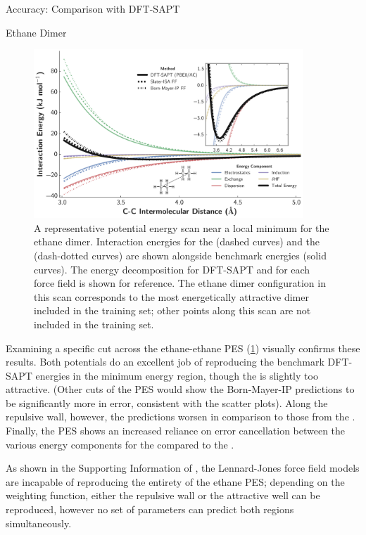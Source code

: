 \begin{subsection}{Accuracy: Comparison with DFT-SAPT}
\begin{subsubsection}{Ethane Dimer}
    \begin{figure}
    \includegraphics[width=0.9\textwidth]{isotropic/ethane_ethane_pes.pdf}
    \caption{
    A representative potential energy scan near a local minimum for the ethane dimer. 
    Interaction energies for the \isaffold (dashed curves) and the \saptff (dash-dotted
    curves) are shown alongside benchmark \saptpbeo energies (solid curves). The
    energy decomposition for DFT-SAPT and for each force field is shown for reference.
     The ethane dimer configuration in this scan corresponds to the most
    energetically attractive dimer included in the training set; other
    points along this scan are not included in the training set.
    }
    \label{fig:isotropic-ethane-pes}
    \end{figure}

Examining a specific cut across the ethane-ethane PES
(\cref{fig:isotropic-ethane-pes}) visually confirms these results.  Both potentials do
an excellent job of reproducing the benchmark DFT-SAPT energies in the minimum
energy region, though the \saptff is slightly too attractive. (Other cuts of
the PES would show the Born-Mayer-IP predictions to be significantly more in error,
consistent with the scatter plots). Along the repulsive wall, however, the
\saptff predictions worsen in comparison to those from the \isaffold. Finally,
the PES shows an increased reliance on error cancellation between the
various energy components for the \saptff compared to the \isaffold.

As shown in the Supporting Information of , the Lennard-Jones force field models
are incapable of reproducing the entirety of the ethane PES; depending on the
weighting function, either the repulsive wall or the attractive well can be
reproduced, however no set of parameters can predict both regions
simultaneously.



\end{subsubsection}
\end{subsection}
